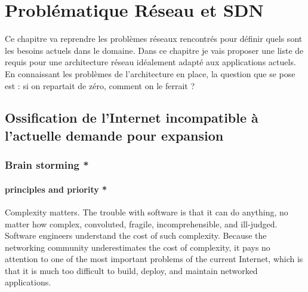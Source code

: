 \chapter{Problématique Réseau et SDN}
\label{chap-1}



Ce chapitre va reprendre les problèmes réseaux rencontrés pour définir quels sont les besoins actuels dans le domaine. Dans ce chapitre je vais proposer une liste de requis pour une architecture réseau idéalement adapté aux applications actuels.
En connaissant les problèmes de l'architecture en place, la question que se pose est : si on repartait de zéro, comment on le ferrait ?


\section{Ossification de l'Internet incompatible à l'actuelle demande pour expansion}

\subsection*{Brain storming *}

\subsubsection{principles and priority *}
Complexity matters. The trouble with software is that it can do anything, no matter how complex, convoluted, fragile, incomprehensible, and ill-judged.
Software engineers understand the cost of such complexity. Because the networking community underestimates the cost of complexity, it pays no attention to one of the most important problems of the current Internet, which is that it is much too difficult to build, deploy, and maintain networked applications.


